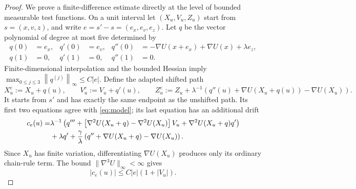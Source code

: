 \documentclass[11pt]{article}
\theoremstyle{definition}
\begin{document}
\begin{proof}
We prove a finite-difference estimate directly at the level of bounded
measurable test functions. On a unit interval let $(X_u,V_u,Z_u)$ start from
$s=(x,v,z)$, and write $e=s'-s=(e_x,e_v,e_z)$. Let $q$ be the vector
polynomial of degree at most five determined by
\begin{align*}
 q(0)&=e_x,&q'(0)&=e_v,&
 q''(0)&=-\nabla U(x+e_x)+\nabla U(x)+\lambda e_z,\\
 q(1)&=0,&q'(1)&=0,&q''(1)&=0.
\end{align*}
Finite-dimensional interpolation and the bounded Hessian imply
$\max_{0\leq j\leq3}\left\|q^{(j)}\right\|_\infty\leq C|e|$.
Define the adapted shifted path
\[
 X_u^e:=X_u+q(u),\qquad V_u^e:=V_u+q'(u),\qquad
 Z_u^e:=Z_u+\lambda^{-1}
       \left(q''(u)+\nabla U(X_u+q(u))-\nabla U(X_u)\right).
\]
It starts from $s'$ and has exactly the same endpoint as the unshifted path.
Its first two equations agree with \eqref{eq:model}; its last equation has
an additional drift
\begin{align}\label{eq:control}
 c_e(u)=&\lambda^{-1}\left(q'''
       +\left[\nabla^2U(X_u+q)-\nabla^2U(X_u)\right]V_u
       +\nabla^2U(X_u+q)q'\right)\notag\\
 &+\lambda q'+\frac\gamma\lambda
          \left(q''+\nabla U(X_u+q)-\nabla U(X_u)\right).
\end{align}
Since $X_u$ has finite variation, differentiating $\nabla U(X_u)$ produces
only its ordinary chain-rule term. The bound
$\|\nabla^3U\|_\infty<\infty$
gives
\begin{equation}\label{eq:finitecontrolbound}
 |c_e(u)|\leq C|e|(1+|V_u|).
\end{equation}


\end{proof}
\end{document}
